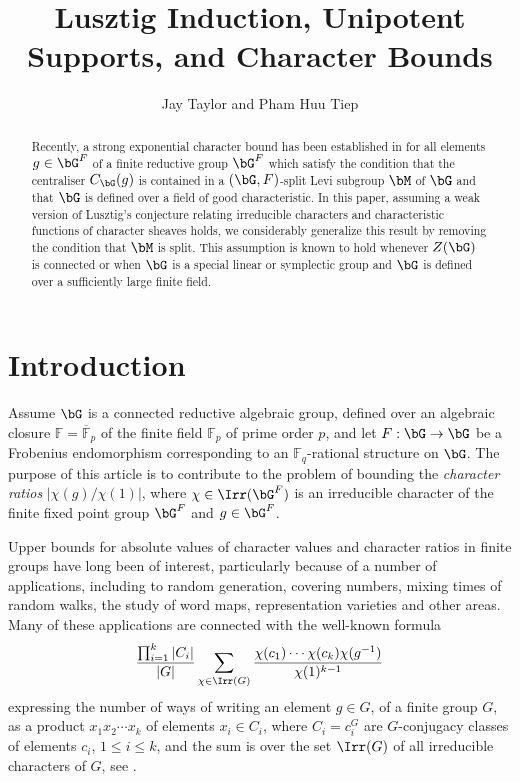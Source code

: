 \documentclass[eqthmnum,nocolour,skinny]{jt-calcs}
\title{Lusztig Induction, Unipotent Supports, and Character Bounds}
\author{Jay Taylor and Pham Huu Tiep}
\begin{document}
\begin{abstract}
Recently, a strong exponential character bound has been established in 
\cite{bezrukavnikov-liebeck-shalev-tiep:2017:character-bounds-grps-Lie-type} for all elements $g \in \bG^F$ of a finite reductive group $\bG^F$ which satisfy the condition that the centraliser $C_\bG(g)$ is contained in a $(\bG,F)$-split Levi subgroup $\bM$ of $\bG$ and that $\bG$ is defined over a field of good characteristic. In this paper, assuming a weak version of Lusztig's conjecture relating irreducible characters and characteristic functions of character sheaves holds, we considerably generalize this result by removing the condition that $\bM$ is split. This assumption is known to hold whenever $Z(\bG)$ is connected or when $\bG$ is a special linear or symplectic group and $\bG$ is defined over a sufficiently large finite field.
\end{abstract}

\section{Introduction}

\begin{pa}
Assume $\bG$ is a connected reductive algebraic group, defined over an algebraic closure $\mathbb{F} = \overline{\mathbb{F}}_p$ of the finite field $\mathbb{F}_p$ of prime order $p$, and let $F : \bG \to \bG$ be a Frobenius endomorphism corresponding to an $\mathbb{F}_q$-rational structure on $\bG$. The purpose of this article is to contribute to the problem of bounding the {\it character ratios} $|\chi(g)/\chi(1)|$, where $\chi \in \Irr(\bG^F)$ is an irreducible character of the finite fixed point group $\bG^F$ and $g \in \bG^F$.
\end{pa}

\begin{pa}
Upper bounds for absolute values of character values and character ratios in finite groups have long been of interest, particularly because of a number of
applications, including to random generation, covering numbers, mixing times of random walks, the study of word maps, representation varieties and other areas. Many of these applications are connected with the well-known formula
\begin{equation*}
\frac{\prod_{i=1}^k |C_i|}{|G|}\sum_{\chi\in \Irr(G)} \frac{\chi(c_1)\cdots \chi(c_k)\chi(g^{-1})}{\chi(1)^{k-1}}
\end{equation*}
expressing the number of ways of writing an element $g \in G$, of a finite group $G$, as a product $x_1x_2\cdots x_k$ of elements $x_i\in C_i$, where $C_i = c_i^G$ are $G$-conjugacy classes of elements $c_i$, $1 \leq i \leq k$, and the sum is over the set $\Irr(G)$ of all irreducible characters of $G$, see \cite[10.1]{AH}.
\end{pa}
\end{document}
